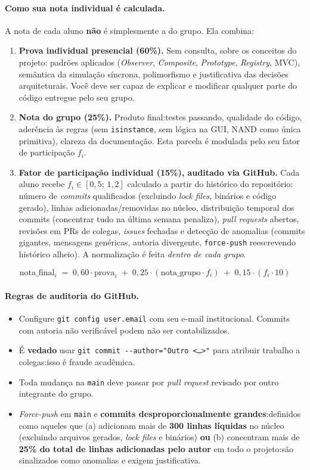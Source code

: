 \documentclass[11pt,a4paper]{article}
\begin{document}
\paragraph{Como sua nota individual é calculada.} A nota de cada aluno \textbf{não} é simplesmente a do grupo. Ela combina:
\begin{enumerate}
    \item \textbf{Prova individual presencial (60\%).} Sem consulta, sobre os conceitos do projeto: padrões aplicados (\textit{Observer}, \textit{Composite}, \textit{Prototype}, \textit{Registry}, MVC), semântica da simulação síncrona, polimorfismo e justificativa das decisões arquiteturais. Você deve ser capaz de explicar e modificar qualquer parte do código entregue pelo seu grupo.
    \item \textbf{Nota do grupo (25\%).} Produto final:testes passando, qualidade do código, aderência às regras (sem \texttt{isinstance}, sem lógica na GUI, NAND como única primitiva), clareza da documentação. Esta parcela é modulada pelo seu fator de participação $f_i$.
    \item \textbf{Fator de participação individual (15\%), auditado via GitHub.} Cada aluno recebe $f_i \in [0{,}5;\, 1{,}2]$ calculado a partir do histórico do repositório: número de \textit{commits} qualificados (excluindo \textit{lock files}, binários e código gerado), linhas adicionadas/removidas no núcleo, distribuição temporal dos commits (concentrar tudo na última semana penaliza), \textit{pull requests} abertos, revisões em PRs de colegas, \textit{issues} fechadas e detecção de anomalias (commits gigantes, mensagens genéricas, autoria divergente, \texttt{force-push} reescrevendo histórico alheio). A normalização é feita \emph{dentro de cada grupo}.
\end{enumerate}

\[
\text{nota\_final}_i \;=\; 0{,}60 \cdot \text{prova}_i \;+\; 0{,}25 \cdot (\text{nota\_grupo} \cdot f_i) \;+\; 0{,}15 \cdot (f_i \cdot 10)
\]

\paragraph{Regras de auditoria do GitHub.}
\begin{itemize}
    \item Configure \texttt{git config user.email} com seu e-mail institucional. Commits com autoria não verificável podem não ser contabilizados.
    \item É \textbf{vedado} usar \texttt{git commit -{}-author="Outro <\dots>"} para atribuir trabalho a colegas:isso é fraude acadêmica.
    \item Toda mudança na \texttt{main} deve passar por \textit{pull request} revisado por outro integrante do grupo.
    \item \textit{Force-push} em \texttt{main} e \textbf{commits desproporcionalmente grandes}:definidos como aqueles que (a) adicionam mais de \textbf{300 linhas líquidas} no núcleo (excluindo arquivos gerados, \textit{lock files} e binários) \textbf{ou} (b) concentram mais de \textbf{25\% do total de linhas adicionadas pelo autor} em todo o projeto:são sinalizados como anomalias e exigem justificativa.
\end{itemize}
\end{document}
